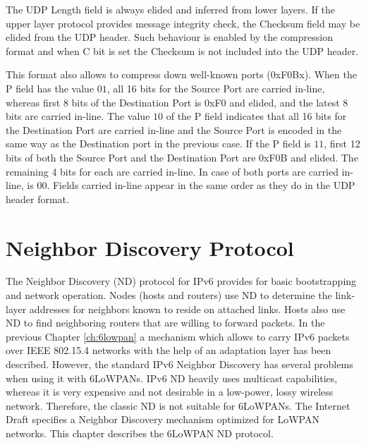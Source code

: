\documentclass[12pt, titlepage, a4paper]{report}
\begin{document}
The UDP Length field is always elided and inferred from lower layers. If the upper layer protocol provides message integrity check, the Checksum field may be elided from the UDP header. Such behaviour is enabled by the compression format and when C bit is set the Checksum is not included into the UDP header.

This format also allows to compress down well-known ports (0xF0Bx).	When the P field has the value $01$, all 16 bits for the Source Port are carried in-line, whereas first 8 bits of the Destination Port is 0xF0 and elided, and the latest 8 bits are carried in-line. The value $10$ of the P field indicates that all 16 bits for the Destination Port are carried in-line and the Source Port is encoded in the same way as the Destination port in the previous case. If the P field is $11$, first 12 bits of both the Source Port and the Destination Port are 0xF0B and elided. The remaining 4 bits for each are carried in-line. In case of both ports are carried in-line, is $00$. Fields carried in-line appear in the same order as they do in the UDP header format.  

\chapter{Neighbor Discovery Protocol}\label{ch:nd}
The Neighbor Discovery (ND) protocol for IPv6 \cite{rfc4861} provides for basic bootstrapping and network operation. Nodes (hosts and routers) use ND to determine the link-layer addresses for neighbors known to reside on attached links. Hosts also use ND to find neighboring routers that are willing to forward packets. In the previous Chapter \ref{ch:6lowpan} a mechanism which allows to carry IPv6 packets over IEEE 802.15.4 networks with the help of an adaptation layer has been described. However, the standard IPv6 Neighbor Discovery has several problems when using it with 6LoWPANs. IPv6 ND heavily uses multicast capabilities, whereas it is very expensive and not desirable in a low-power, lossy wireless network. Therefore, the classic ND is not suitable for 6LoWPANs. The Internet Draft \cite{draft-nd-07} specifies a Neighbor Discovery mechanism optimized for LoWPAN networks. This chapter describes the 6LoWPAN ND protocol.
\end{document}
